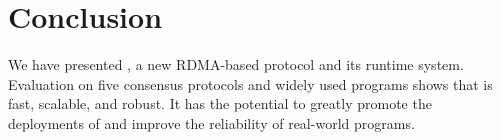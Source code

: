 \section{Conclusion}\label{sec:conclusion}
We have presented \xxx, a new RDMA-based \paxos protocol and its runtime 
system. Evaluation on five consensus protocols and \nprog widely used programs 
shows that \xxx is fast, scalable, and robust. It has the potential to greatly 
promote the deployments of \paxos and improve the reliability of real-world 
programs.
